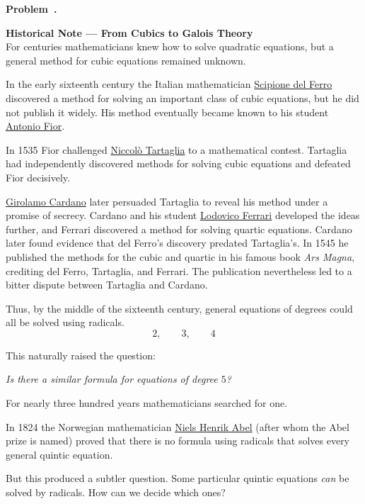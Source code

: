 \documentclass[10pt]{article}
\newcounter{problem}
\newenvironment{problem}[1][]{
  \refstepcounter{problem}
  \par\noindent\textbf{Problem~\theproblem. #1}\par
  \vspace{0.5em}
}{\vspace{1em}}
\begin{document}
\begin{problem}
\textbf{Historical Note --- From Cubics to Galois Theory}\\

For centuries mathematicians knew how to solve quadratic equations, but a general method for cubic equations remained unknown.

In the early sixteenth century the Italian mathematician \href{https://en.wikipedia.org/wiki/Scipione_del_Ferro}{Scipione del Ferro} discovered a method for solving an important class of cubic equations,
but he did not publish it widely. His method eventually became known to his student \href{https://www.encyclopedia.com/science/encyclopedias-almanacs-transcripts-and-maps/antonio-fior}{Antonio Fior}.

In 1535 Fior challenged \href{https://en.wikipedia.org/wiki/Nicolo_Tartaglia}{Niccol\`o Tartaglia} to a mathematical contest. Tartaglia had independently discovered methods for solving cubic
equations and defeated Fior decisively.

\href{https://en.wikipedia.org/wiki/Gerolamo_Cardano}{Girolamo Cardano} later persuaded Tartaglia to reveal his method under a promise of secrecy. Cardano and his student \href{https://en.wikipedia.org/wiki/Lodovico_Ferrari}{Lodovico Ferrari}
developed the ideas further, and Ferrari discovered a method for solving quartic equations. Cardano later found evidence that del Ferro's discovery predated Tartaglia's. In 1545 he published the
methods for the cubic and quartic in his famous book \emph{Ars Magna}, crediting del Ferro, Tartaglia, and Ferrari. The publication nevertheless led to a bitter dispute between Tartaglia and Cardano.

Thus, by the middle of the sixteenth century, general equations of degrees could all be solved using radicals.
\[
2,\qquad 3,\qquad 4
\]

This naturally raised the question:

\begin{center}
\emph{Is there a similar formula for equations of degree \(5\)?}
\end{center}

For nearly three hundred years mathematicians searched for one.

In 1824 the Norwegian mathematician \href{https://en.wikipedia.org/wiki/Niels_Henrik_Abel}{Niels Henrik Abel} (after whom the Abel prize is named) proved that there is no formula using radicals that solves every general quintic equation.

But this produced a subtler question. Some particular quintic equations \emph{can} be solved by radicals. How can we decide which ones?


\end{problem}
\end{document}
